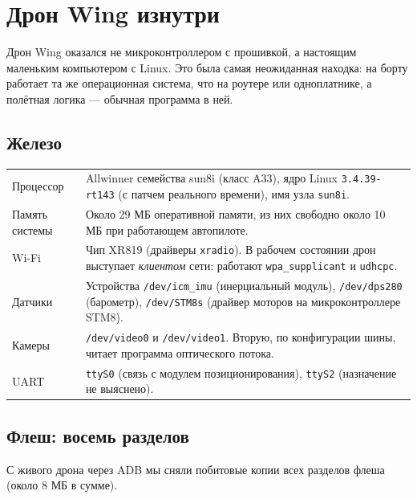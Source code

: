 \chapter{Дрон Wing изнутри}

Дрон Wing оказался не микроконтроллером с прошивкой, а настоящим маленьким компьютером с Linux. Это была самая неожиданная находка: на борту работает та же операционная система, что на роутере или одноплатнике, а полётная логика --- обычная программа в ней.

\section{Железо}

\begin{tabularx}{\textwidth}{@{}p{3.3cm} Y@{}}
\toprule
{} &  \\ \midrule
Процессор & Allwinner семейства sun8i (класс A33), ядро Linux \texttt{3.4.39-rt143} (с патчем реального времени), имя узла \texttt{sun8i}. \pr{} \\
Память системы & Около 29 МБ оперативной памяти, из них свободно около 10 МБ при работающем автопилоте. \pr{} \\
Wi-Fi & Чип XR819 (драйверы \texttt{xradio}). В рабочем состоянии дрон выступает \emph{клиентом} сети: работают \texttt{wpa\_supplicant} и \texttt{udhcpc}. \pr{} \\
Датчики & Устройства \texttt{/dev/icm\_imu} (инерциальный модуль), \texttt{/dev/dps280} (барометр), \texttt{/dev/STM8s} (драйвер моторов на микроконтроллере STM8). \pr{} \\
Камеры & \texttt{/dev/video0} и \texttt{/dev/video1}. Вторую, по конфигурации шины, читает программа оптического потока. \vyv{} \\
UART & \texttt{ttyS0} (связь с модулем позиционирования), \texttt{ttyS2} (назначение не выяснено). \pr{} \\ \bottomrule
\end{tabularx}

\section{Флеш: восемь разделов}

С живого дрона через ADB мы сняли побитовые копии всех разделов флеша (около 8 МБ в сумме).


